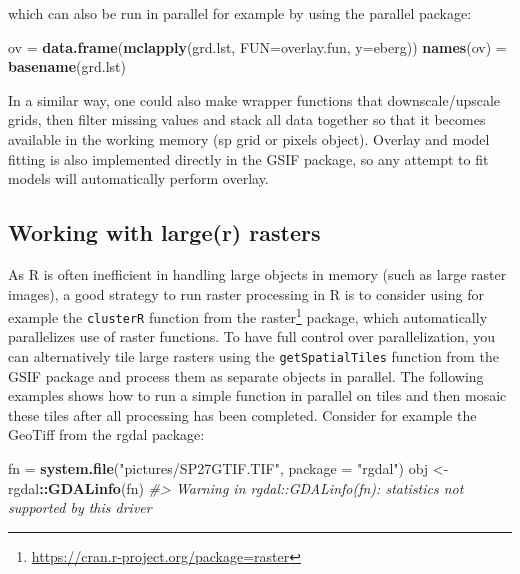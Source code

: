 \documentclass[graybox,natbib,nospthms,UStrade]{svmono}
\newenvironment{Shaded}{\begin{snugshade}}{\end{snugshade}}
\newcommand{\CommentTok}[1]{\textcolor[rgb]{0.37,0.37,0.37}{\textit{#1}}}
\newcommand{\DataTypeTok}[1]{\textcolor[rgb]{0.27,0.27,0.27}{#1}}
\newcommand{\KeywordTok}[1]{\textcolor[rgb]{0.27,0.27,0.27}{\textbf{#1}}}
\newcommand{\NormalTok}[1]{#1}
\newcommand{\OperatorTok}[1]{\textcolor[rgb]{0.43,0.43,0.43}{\textbf{#1}}}
\newcommand{\StringTok}[1]{\textcolor[rgb]{0.5,0.5,0.5}{#1}}
\renewcommand{\href}[2]{#2 (\url{#1})}
\renewcommand{\href}[2]{#2\footnote{\url{#1}}}
\begin{document}
which can also be run in parallel for example by using the parallel package:

\begin{Shaded}
\begin{Highlighting}[]
\NormalTok{ov =}\StringTok{ }\KeywordTok{data.frame}\NormalTok{(}\KeywordTok{mclapply}\NormalTok{(grd.lst, }\DataTypeTok{FUN=}\NormalTok{overlay.fun, }\DataTypeTok{y=}\NormalTok{eberg))}
\KeywordTok{names}\NormalTok{(ov) =}\StringTok{ }\KeywordTok{basename}\NormalTok{(grd.lst)}
\end{Highlighting}
\end{Shaded}

In a similar way, one could also make wrapper functions that downscale/upscale grids, then filter missing values and stack all data together so that it becomes available in the working memory (sp grid or pixels object). Overlay and model fitting is also implemented directly in the GSIF package, so any attempt to fit models will automatically perform overlay.

\hypertarget{working-with-larger-rasters}{%
\subsection{Working with large(r) rasters}\label{working-with-larger-rasters}}

As R is often inefficient in handling large objects in memory (such as large raster images), a good strategy to run raster processing in R is to consider using for example the \texttt{clusterR} function from the \href{https://cran.r-project.org/package=raster}{raster} package, which automatically parallelizes use of raster functions. To have full control over parallelization, you can alternatively tile large rasters using the \texttt{getSpatialTiles} function from the GSIF package and process them as separate objects in parallel. The following examples shows how to run a simple function in parallel on tiles and then mosaic these tiles after all processing has been completed. Consider for example the GeoTiff from the rgdal package:

\begin{Shaded}
\begin{Highlighting}[]
\NormalTok{fn =}\StringTok{ }\KeywordTok{system.file}\NormalTok{(}\StringTok{"pictures/SP27GTIF.TIF"}\NormalTok{, }\DataTypeTok{package =} \StringTok{"rgdal"}\NormalTok{)}
\NormalTok{obj <-}\StringTok{ }\NormalTok{rgdal}\OperatorTok{::}\KeywordTok{GDALinfo}\NormalTok{(fn)}
\CommentTok{#> Warning in rgdal::GDALinfo(fn): statistics not supported by this driver}
\end{Highlighting}
\end{Shaded}
\end{document}
